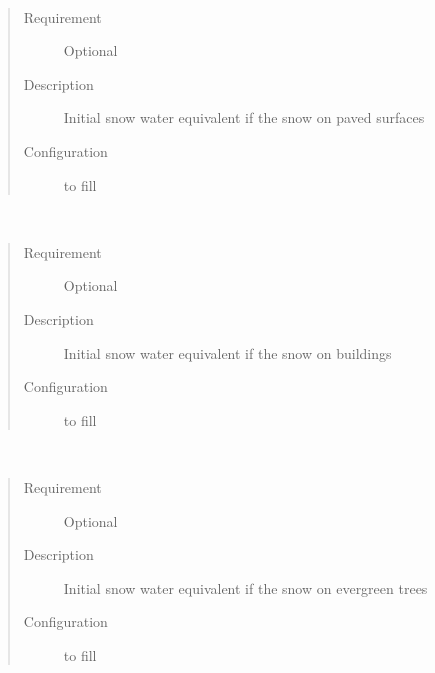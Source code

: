 \documentclass[letterpaper,10pt,english]{sphinxmanual}
\begin{document}
\begin{fulllineitems}
\label{\detokenize{input_files/Initial_Conditions/Snow_related_parameters:cmdoption-arg-snowpackpaved}}~\begin{quote}\begin{description}
\item[{Requirement}] \leavevmode
Optional

\item[{Description}] \leavevmode
Initial snow water equivalent if the snow on paved surfaces

\item[{Configuration}] \leavevmode
to fill

\end{description}\end{quote}

\end{fulllineitems}


\begin{fulllineitems}
\label{\detokenize{input_files/Initial_Conditions/Snow_related_parameters:cmdoption-arg-snowpackbldgs}}~\begin{quote}\begin{description}
\item[{Requirement}] \leavevmode
Optional

\item[{Description}] \leavevmode
Initial snow water equivalent if the snow on buildings

\item[{Configuration}] \leavevmode
to fill

\end{description}\end{quote}

\end{fulllineitems}


\begin{fulllineitems}
\label{\detokenize{input_files/Initial_Conditions/Snow_related_parameters:cmdoption-arg-snowpackevetr}}~\begin{quote}\begin{description}
\item[{Requirement}] \leavevmode
Optional

\item[{Description}] \leavevmode
Initial snow water equivalent if the snow on evergreen trees

\item[{Configuration}] \leavevmode
to fill

\end{description}\end{quote}

\end{fulllineitems}
\end{document}
